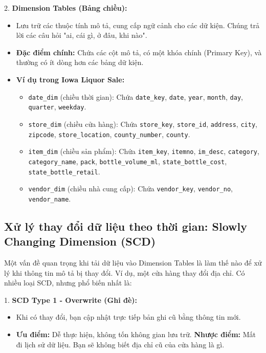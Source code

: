 2.  \textbf{Dimension Tables (Bảng chiều):}
    \begin{itemize}
        \item Lưu trữ các thuộc tính mô tả, cung cấp ngữ cảnh cho các dữ kiện. Chúng trả lời các câu hỏi "ai, cái gì, ở đâu, khi nào".
        \item \textbf{Đặc điểm chính:} Chứa các cột mô tả, có một khóa chính (Primary Key), và thường có ít dòng hơn các bảng dữ kiện.
        \item \textbf{Ví dụ trong Iowa Liquor Sale:}
            \begin{itemize}
                \item \texttt{date\_dim} (chiều thời gian): Chứa \texttt{date\_key}, \texttt{date}, \texttt{year}, \texttt{month}, \texttt{day}, \texttt{quarter}, \texttt{weekday}.
                \item \texttt{store\_dim} (chiều cửa hàng): Chứa \texttt{store\_key}, \texttt{store\_id}, \texttt{address}, \texttt{city}, \texttt{zipcode}, \texttt{store\_location}, \texttt{county\_number}, \texttt{county}.
                \item \texttt{item\_dim} (chiều sản phẩm): Chứa \texttt{item\_key}, \texttt{itemno}, \texttt{im\_desc}, \texttt{category}, \texttt{category\_name}, \texttt{pack}, \texttt{bottle\_volume\_ml}, \texttt{state\_bottle\_cost}, \texttt{state\_bottle\_retail}.
                \item \texttt{vendor\_dim} (chiều nhà cung cấp): Chứa \texttt{vendor\_key}, \texttt{vendor\_no}, \texttt{vendor\_name}.
            \end{itemize}
    \end{itemize}

\subsection{Xử lý thay đổi dữ liệu theo thời gian: Slowly Changing Dimension (SCD)}

Một vấn đề quan trọng khi tải dữ liệu vào Dimension Tables là làm thế nào để xử lý khi thông tin mô tả bị thay đổi. Ví dụ, một cửa hàng thay đổi địa chỉ. Có nhiều loại SCD, nhưng phổ biến nhất là:

1.  \textbf{SCD Type 1 - Overwrite (Ghi đè):}
    \begin{itemize}
        \item Khi có thay đổi, bạn cập nhật trực tiếp bản ghi cũ bằng thông tin mới.
        \item \textbf{Ưu điểm:} Dễ thực hiện, không tốn không gian lưu trữ.
        \textbf{Nhược điểm:} Mất đi lịch sử dữ liệu. Bạn sẽ không biết địa chỉ cũ của cửa hàng là gì.
    \end{itemize}

